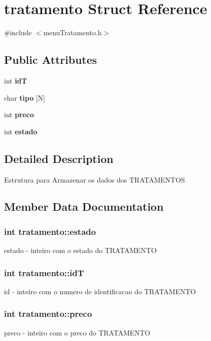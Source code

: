 \section{tratamento Struct Reference}
\label{structtratamento}


{\ttfamily \#include $<$menu\+Tratamento.\+h$>$}

\subsection*{Public Attributes}
\begin{DoxyCompactItemize}
\item 
int {\bf id\+T}
\item 
char {\bf tipo} [N]
\item 
int {\bf preco}
\item 
int {\bf estado}
\end{DoxyCompactItemize}


\subsection{Detailed Description}
Estrutura para Armazenar os dados dos T\+R\+A\+T\+A\+M\+E\+N\+T\+O\+S 

\subsection{Member Data Documentation}
\subsubsection[{estado}]{\setlength{\rightskip}{0pt plus 5cm}int tratamento\+::estado}\label{structtratamento_a4e46e21b9d85e3ddfa7f7671f319bda4}
estado -\/ inteiro com o estado do T\+R\+A\+T\+A\+M\+E\+N\+T\+O 
\subsubsection[{id\+T}]{\setlength{\rightskip}{0pt plus 5cm}int tratamento\+::id\+T}\label{structtratamento_ae7f513303bbb726ec1712d3ee5f5ff11}
id -\/ inteiro com o numero de identificacao do T\+R\+A\+T\+A\+M\+E\+N\+T\+O 
\subsubsection[{preco}]{\setlength{\rightskip}{0pt plus 5cm}int tratamento\+::preco}\label{structtratamento_aa677dcd5d93345866cce25447deb89c7}
preco -\/ inteiro com o preco do T\+R\+A\+T\+A\+M\+E\+N\+T\+O 
